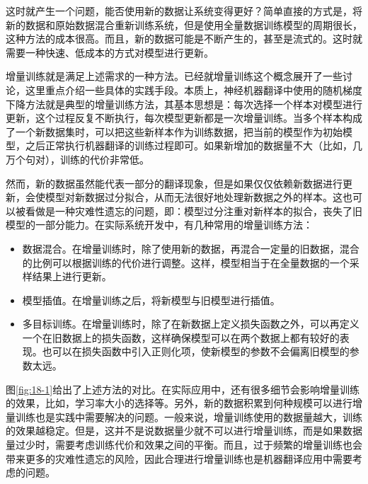 \parinterval 这时就产生一个问题，能否使用新的数据让系统变得更好？简单直接的方式是，将新的数据和原始数据混合重新训练系统，但是使用全量数据训练模型的周期很长，这种方法的成本很高。而且，新的数据可能是不断产生的，甚至是流式的。这时就需要一种快速、低成本的方式对模型进行更新。

\parinterval 增量训练就是满足上述需求的一种方法。{\chapterthirteen}已经就增量训练这个概念展开了一些讨论，这里重点介绍一些具体的实践手段。本质上，神经机器翻译中使用的随机梯度下降方法就是典型的增量训练方法，其基本思想是：每次选择一个样本对模型进行更新，这个过程反复不断执行，每次模型更新都是一次增量训练。当多个样本构成了一个新数据集时，可以把这些新样本作为训练数据，把当前的模型作为初始模型，之后正常执行机器翻译的训练过程即可。如果新增加的数据量不大（比如，几万个句对），训练的代价非常低。

\parinterval 然而，新的数据虽然能代表一部分的翻译现象，但是如果仅仅依赖新数据进行更新，会使模型对新数据过分拟合，从而无法很好地处理新数据之外的样本。这也可以被看做是一种灾难性遗忘的问题，即：模型过分注重对新样本的拟合，丧失了旧模型的一部分能力。在实际系统开发中，有几种常用的增量训练方法：

\begin{itemize}
\vspace{0.5em}
\item 数据混合。在增量训练时，除了使用新的数据，再混合一定量的旧数据，混合的比例可以根据训练的代价进行调整。这样，模型相当于在全量数据的一个采样结果上进行更新。

\vspace{0.5em}
\item 模型插值。在增量训练之后，将新模型与旧模型进行插值。

\vspace{0.5em}
\item 多目标训练。在增量训练时，除了在新数据上定义损失函数之外，可以再定义一个在旧数据上的损失函数，这样确保模型可以在两个数据上都有较好的表现。也可以在损失函数中引入正则化项，使新模型的参数不会偏离旧模型的参数太远。

\vspace{0.5em}
\end{itemize}

\parinterval 图\ref{fig:18-1}给出了上述方法的对比。在实际应用中，还有很多细节会影响增量训练的效果，比如，学习率大小的选择等。另外，新的数据积累到何种规模可以进行增量训练也是实践中需要解决的问题。一般来说，增量训练使用的数据量越大，训练的效果越稳定。但是，这并不是说数据量少就不可以进行增量训练，而是如果数据量过少时，需要考虑训练代价和效果之间的平衡。而且，过于频繁的增量训练也会带来更多的灾难性遗忘的风险，因此合理进行增量训练也是机器翻译应用中需要考虑的问题。


